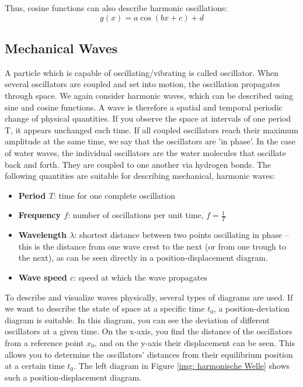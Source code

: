 Thus, cosine functions can also describe harmonic oscillations:
\begin{equation}
    g(x) = a \cos(bx + c) + d
\end{equation}


\subsection{Mechanical Waves}
A particle which is capable of oscillating/vibrating is called oscillator. 
When several oscillators are coupled and set into motion, the oscillation propagates through space. We again consider harmonic waves, which can be described using sine and cosine functions. A wave is therefore a spatial and temporal periodic change of physical quantities.
If you observe the space at intervals of one period
T, it appears unchanged each time. If all coupled oscillators reach their maximum amplitude at the same time, we say that the oscillators are 'in phase'.
In the case of water waves, the individual oscillators are the water molecules that oscillate back and forth.
They are coupled to one another via hydrogen bonds. The following quantities are suitable for describing
mechanical, harmonic waves:
\begin{itemize}
    \item \textbf{Period $T$}: time for one complete oscillation
    \item \textbf{Frequency $f$}: number of oscillations per unit time, $f = \frac{1}{T}$
    \item \textbf{Wavelength $\lambda$}: shortest distance between two points oscillating in phase -- this is the distance from one wave crest to the next (or from one trough to the next), as can be seen directly in a position-displacement diagram.
    \item \textbf{Wave speed $c$}: speed at which the wave propagates
\end{itemize}
To describe and visualize waves physically, several types of diagrams are used. If we want to describe the state of space at a specific time $t_0$, a position-deviation diagram is suitable. In this diagram, you can see the deviation of different oscillators at a given time. On the x-axis, you find the distance of the oscillators from a reference point $x_0$, and on the y-axis their displacement can be seen. This allows you to determine the oscillators' distances from their equilibrium position at a certain time  $t_0$.   The left diagram in Figure \ref{img: harmonische Welle} shows such a position-displacement diagram. \\
